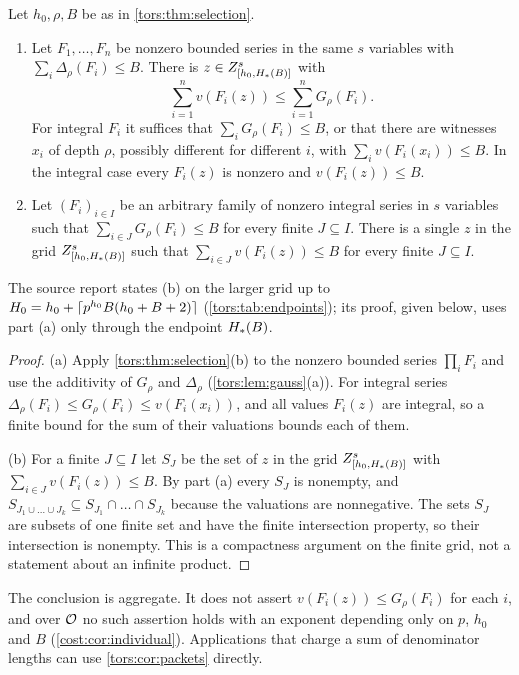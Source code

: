 \begin{corollary}\label{tors:cor:packets}
Let $h_0,\rho,B$ be as in \cref{tors:thm:selection}.
\begin{enumerate}[label=\textup{(\alph*)}]
\item Let $F_1,\dots,F_n$ be nonzero bounded series in the same $s$ variables with
  $\sum_i\Delta_\rho(F_i)\le B$. There is $z\in Z_{[h_0,H_{*}(B)]}^s$ with
  \[
    \sum_{i=1}^nv(F_i(z))\le\sum_{i=1}^nG_\rho(F_i).
  \]
  For integral $F_i$ it suffices that $\sum_iG_\rho(F_i)\le B$, or that there are
  witnesses $x_i$ of depth $\rho$, possibly different for different $i$, with
  $\sum_iv(F_i(x_i))\le B$. In the integral case every $F_i(z)$ is nonzero and
  $v(F_i(z))\le B$.
\item Let $(F_i)_{i\in I}$ be an arbitrary family of nonzero integral series in $s$
  variables such that $\sum_{i\in J}G_\rho(F_i)\le B$ for every finite $J\subseteq I$.
  There is a single $z$ in the grid $Z_{[h_0,H_{*}(B)]}^s$ such that
  $\sum_{i\in J}v(F_i(z))\le B$ for every finite $J\subseteq I$.
\end{enumerate}
\end{corollary}

The source report states (b) on the larger grid up to
$H_0=h_0+\lceil p^{h_0}B(h_0+B+2)\rceil$ (\cref{tors:tab:endpoints}); its proof, given below,
uses part (a) only through the endpoint $H_{*}(B)$.

\begin{proof}
(a) Apply \cref{tors:thm:selection}(b) to the nonzero bounded series $\prod_iF_i$ and use
the additivity of $G_\rho$ and $\Delta_\rho$ (\cref{tors:lem:gauss}(a)). For integral
series $\Delta_\rho(F_i)\le G_\rho(F_i)\le v(F_i(x_i))$, and all values $F_i(z)$ are
integral, so a finite bound for the sum of their valuations bounds each of them.

(b) For a finite $J\subseteq I$ let $S_J$ be the set of $z$ in the grid
$Z_{[h_0,H_{*}(B)]}^s$ with $\sum_{i\in J}v(F_i(z))\le B$. By part (a) every $S_J$ is
nonempty, and
$S_{J_1\cup\dots\cup J_k}\subseteq S_{J_1}\cap\dots\cap S_{J_k}$ because the valuations
are nonnegative. The sets $S_J$ are subsets of one finite set and have the finite
intersection property, so their intersection is nonempty. This is a compactness argument
on the finite grid, not a statement about an infinite product.
\end{proof}

The conclusion is aggregate. It does not assert $v(F_i(z))\le G_\rho(F_i)$ for each $i$,
and over $\mathcal{O}$ no such assertion holds with an exponent depending only on $p$, $h_0$ and
$B$ (\cref{cost:cor:individual}). Applications that charge a sum of denominator lengths
can use \cref{tors:cor:packets} directly.


